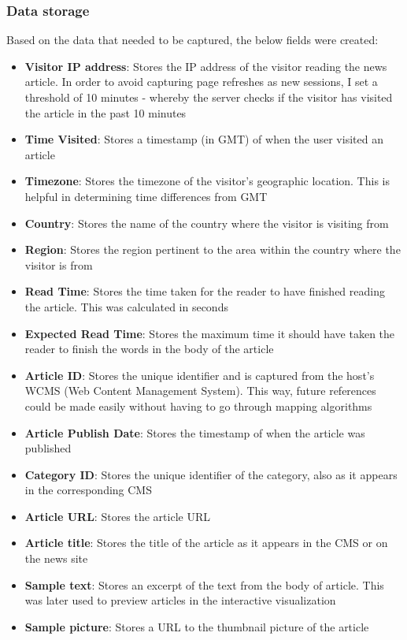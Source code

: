 \documentclass[12pt]{article}
\begin{document}
\vfill

\subsubsection{Data storage}

Based on the data that needed to be captured, the below fields were created:
\begin{itemize}
\item \textbf{Visitor IP address}: Stores the IP address of the visitor reading the news article. In order to avoid capturing page refreshes as new sessions, I set a threshold of 10 minutes - whereby the server checks if the visitor has visited the article in the past 10 minutes
\item \textbf{Time Visited}: Stores a timestamp (in GMT) of when the user visited an article 
\item \textbf{Timezone}: Stores the timezone of the visitor's geographic location. This is helpful in determining time differences from GMT
\item \textbf{Country}: Stores the name of the country where the visitor is visiting from
\item \textbf{Region}: Stores the region pertinent to the area within the country where the visitor is from
\item \textbf{Read Time}: Stores the time taken for the reader to have finished reading the article. This was calculated in seconds
\item \textbf{Expected Read Time}: Stores the maximum time it should have taken the reader to finish the words in the body of the article
\item \textbf{Article ID}: Stores the unique identifier and is captured from the host's WCMS (Web Content Management System). This way, future references could be made easily without having to go through mapping algorithms
\item \textbf{Article Publish Date}: Stores the timestamp of when the article was published
\item \textbf{Category ID}: Stores the unique identifier of the category, also as it appears in the corresponding CMS
\item \textbf{Article URL}: Stores the article URL 
\item \textbf{Article title}: Stores the title of the article as it appears in the CMS or on the news site
\item \textbf{Sample text}: Stores an excerpt of the text from the body of article. This was later used to preview articles in the interactive visualization 
\item \textbf{Sample picture}: Stores a URL to the thumbnail picture of the article

\end{itemize}
\end{document}
